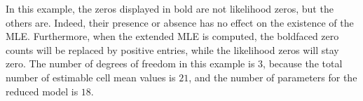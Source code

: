 \documentclass[aos,MSNbibl,nameyear,dvips]{arximspdf}
\begin{document}
\begin{example}
\begin{center}
\begin{tabular}{ccc}
\hline
\end{tabular}
\end{center}\vspace*{7pt}
%
In this example, the zeros displayed in bold are not likelihood zeros,
but the others are. Indeed, their presence or absence has no effect on
the existence of the MLE. Furthermore, when the extended MLE is
computed, the boldfaced zero counts will be replaced by positive
entries, while the likelihood zeros will stay zero. The number of
degrees of freedom in this example is $3$, because the total number of
estimable cell mean values is $21$, and the number of parameters for
the reduced model is $18$.


\end{example}
\end{document}
